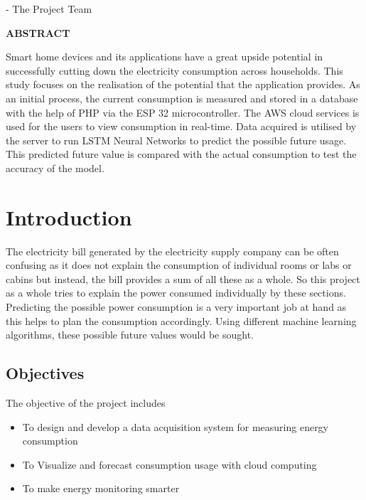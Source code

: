 \documentclass[12 pt]{report}
\begin{document}
\flushright
- The Project Team


\flushleft


\newpage
\begin{center}
\begin{Large}
\textbf{ABSTRACT}

\end{Large}
\end{center}
\justifying
Smart home devices and its applications have a great upside potential in successfully cutting down the electricity consumption across households. This study focuses on the realisation of the potential that the application provides. As an initial process, the current consumption is measured and stored in a database with the help of PHP via the ESP 32 microcontroller. The AWS cloud services is used for the users to view consumption in real-time. Data acquired  is utilised by the server to run LSTM Neural Networks to predict the possible future usage. This predicted future value is compared with the actual consumption to test the accuracy of the model.



\newpage
\tableofcontents



\listoffigures


\newpage
\chapter{Introduction}
The electricity bill generated by the electricity supply company can be often confusing as it does not explain the consumption of individual rooms or labs or cabins but instead, the bill provides a sum of all these as a whole. So this project as a whole tries to explain the power consumed individually by these sections. Predicting the possible power consumption is a very important job at hand as this helps to plan the consumption accordingly. Using different machine learning algorithms, these possible future values would be sought.

\section{Objectives}
\item The objective of the project includes

\begin{itemize}
\item To design and develop a data acquisition system for measuring energy consumption
\newline

\item To Visualize and forecast consumption usage with cloud computing
\newline

\item To make energy monitoring smarter
\newline
\end{itemize}
\end{document}

